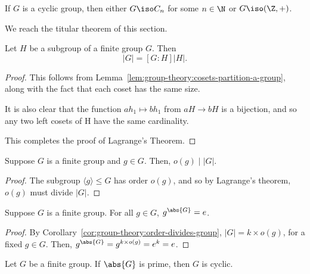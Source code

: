 \documentclass[12pt]{report}
\begin{document}
\begin{lemma}
  If \(G\) is a cyclic group, then either \(G \iso C_{n}\) for some \(n \in \N\) or \(G \iso (\Z, +)\).
\end{lemma}

We reach the titular theorem of this section.

\begin{theorem}
  Let \(H\) be a subgroup of a finite group \(G\). Then
  \[|G| = [G : H]|H|.\]
\end{theorem}

\begin{proof}
  This follows from Lemma~\ref{lem:group-theory:cosets-partition-a-group}, along with the fact that each coset has the same size.

  It is also clear that the function \(ah_{1} \mapsto bh_{1}\)  from \(aH \to bH\) is a bijection, and so any two left cosets of H have the same cardinality.

  This completes the proof of Lagrange's Theorem.
\end{proof}



\begin{corollary}
\label{cor:group-theory:order-divides-group}
  Suppose \(G\) is a finite group and \(g \in G\).
  Then, \(o(g) \mid \left|G\right|\).
\end{corollary}

\begin{proof}
  The subgroup \(\langle g \rangle \leq G\) has order \(o(g)\), and so by Lagrange's theorem, \(o(g)\) must divide \(|G|\).
\end{proof}

\begin{corollary}
\label{cor:group-theory:g-to-power-of-group-order-is-e}
  Suppose \(G\) is a finite group.
  For all \(g \in G\), \(g^{\abs{G}} = e\).
\end{corollary}

\begin{proof}
  By Corollary~\ref{cor:group-theory:order-divides-group}, \(|G| = k \times o(g)\), for a fixed \(g \in G\).
  Then, \(g^{\abs{G}} = g^{k \times o(g)} = e^{k} = e\).
\end{proof}

\begin{corollary}
  Let \(G\) be a finite group.
  If \(\abs{G}\) is prime, then \(G\) is cyclic.
\end{corollary}
\end{document}
